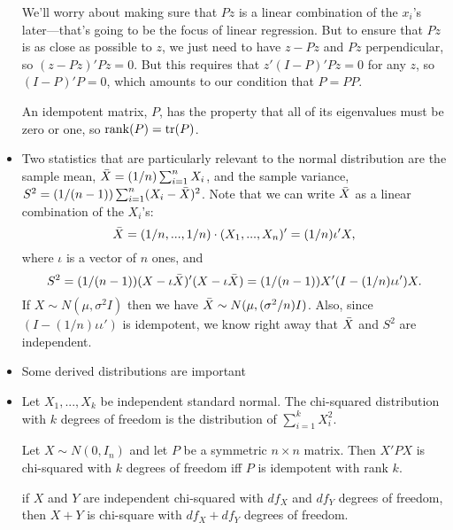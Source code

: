 \begin{itemize}
  We'll worry about making sure that $Pz$ is a linear combination of
  the $x_i$'s later---that's going to be the focus of linear regression.
  But to ensure that $P z$ is as close as possible to $z$, we just
  need to have $z - Pz$ and $Pz$ perpendicular, so $(z - Pz)' Pz = 0$.
  But this requires that $z'(I - P)'P z = 0$ for any $z$, so $(I -
  P)'P = 0$, which amounts to our condition that $P = PP$.

  An idempotent matrix, $P$, has the property that all of its
  eigenvalues must be zero or one, so $\operatorname{rank}(P) = \operatorname{tr}(P)$.

\item Two statistics that are particularly relevant to the normal
  distribution are the sample mean, $\bar{X} = (1/n) \sum_{i=1}^n X_i$, and
  the sample variance, $S^2 = (1/(n-1)) \sum_{i=1}^n (X_i - \bar{X})^2$.  Note
  that we can write $\bar{X}$ as a linear combination of the $X_i$'s:
  \begin{equation*}
    \bar{X} = (1/n,...,1/n) \cdot (X_1,...,X_n)' = (1/n) \iota'X,
  \end{equation*}
  where $\iota$ is a vector of $n$ ones, and
  \begin{equation*}
    S^2 = (1/(n-1)) (X - \iota \bar{X})'(X - \iota \bar{X}) = (1/(n-1)) X'(I - (1/n) \iota\iota')X.
  \end{equation*}
  If $X \sim N(\mu, \sigma^2 I)$ then we have $\bar{X} \sim N(\mu, (\sigma^2/n) I)$.  Also,
  since $(I - (1/n) \iota\iota')$ is idempotent, we know right away that $\bar{X}$
  and $S^2$ are independent.

\item Some derived distributions are important

\item %
  \begin{defn}
    Let $X_1,...,X_k$ be independent standard normal.  The
    chi-squared distribution with $k$ degrees of freedom is the
    distribution of $\sum_{i=1}^k X^2_i$.
  \end{defn}

  \begin{thm}
    Let $X \sim N(0, I_n)$ and let $P$ be a symmetric $n \times n$ matrix.
    Then $X'PX$ is chi-squared with $k$ degrees of freedom iff $P$ is
    idempotent with rank $k$.
  \end{thm}

  \begin{thm}
    if $X$ and $Y$ are independent chi-squared with $df_X$ and $df_Y$
    degrees of freedom, then $X + Y$ is chi-square with $df_X + df_Y$
    degrees of freedom.
  \end{thm}


\end{itemize}
